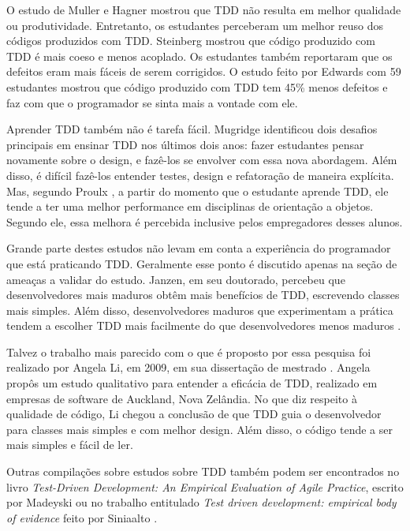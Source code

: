 O estudo de Muller e Hagner \cite{muller-e-hagner} mostrou que TDD não resulta
em melhor qualidade ou produtividade. Entretanto, os estudantes perceberam um 
melhor reuso dos códigos produzidos com TDD. Steinberg \cite{steinberg} mostrou
que código produzido com TDD é mais coeso e menos acoplado. Os estudantes também
reportaram que os defeitos eram mais fáceis de serem corrigidos. O estudo feito
por Edwards \cite{edwards} com 59 estudantes mostrou que código produzido com
TDD tem 45\% menos defeitos e faz com que o programador se sinta mais a vontade
com ele.

Aprender TDD também não é tarefa fácil. Mugridge \cite{mugridge} identificou
dois desafios principais em ensinar TDD nos últimos dois anos: fazer estudantes
pensar novamente sobre o design, e fazê-los se envolver com essa nova
abordagem. Além disso, é difícil fazê-los entender testes, design e refatoração
de maneira explícita. Mas, segundo Proulx \cite{proulx}, a partir do momento que
o estudante aprende TDD, ele tende a ter uma melhor performance em disciplinas
de orientação a objetos. Segundo ele, essa melhora é percebida inclusive pelos
empregadores desses alunos.

Grande parte destes estudos não levam em conta a experiência do programador que
está praticando TDD. Geralmente esse ponto é discutido apenas na seção de
ameaças a validar do estudo. Janzen, em seu doutorado, percebeu que
desenvolvedores mais maduros obtêm mais benefícios de TDD, escrevendo classes
mais simples. Além disso, desenvolvedores maduros que experimentam a prática
tendem a escolher TDD mais facilmente do que desenvolvedores menos maduros
\cite{janzen-phd}.

Talvez o trabalho mais parecido com o que é proposto por essa pesquisa foi
realizado por Angela Li, em 2009, em sua dissertação de mestrado
\cite{angela-li}. Angela propôs um estudo qualitativo para entender a eficácia
de TDD, realizado em empresas de software de Auckland, Nova Zelândia. No que diz
respeito à qualidade de código, Li chegou a conclusão de que TDD guia o
desenvolvedor para classes mais simples e com melhor design. Além disso, o
código tende a ser mais simples e fácil de ler.

Outras compilações sobre estudos sobre TDD também podem ser encontrados no livro
\textit{Test-Driven Development: An Empirical Evaluation of Agile Practice},
escrito por Madeyski \cite{madeyski-livro} ou no trabalho entitulado
\textit{Test driven development: empirical body of evidence} feito por Siniaalto
\cite{tdd-body-of-evidence}.

